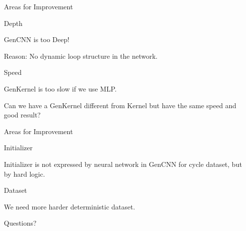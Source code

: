 \documentclass[serif]{beamer}
\begin{document}
\begin{frame}{Areas for Improvement}


    \begin{block}{Depth}

        GenCNN is too Deep!

        Reason: No dynamic loop structure in the network.

	\end{block}

    \begin{block}{Speed}

        GenKernel is too slow if we use MLP.

        Can we have a GenKernel different from Kernel but have the same speed and good result?

    \end{block}

\end{frame}


\begin{frame}{Areas for Improvement}

    \begin{block}{Initializer}

        Initializer is not expressed by neural network in GenCNN for cycle dataset, but by hard logic.

    \end{block}

    \begin{block}{Dataset}

        We need more harder deterministic dataset.

    \end{block}

\end{frame}


\begin{frame}

	\thispagestyle{empty}

	\begin{center}

		\Huge{Questions?}

	\end{center}

\end{frame}

\end{document}
